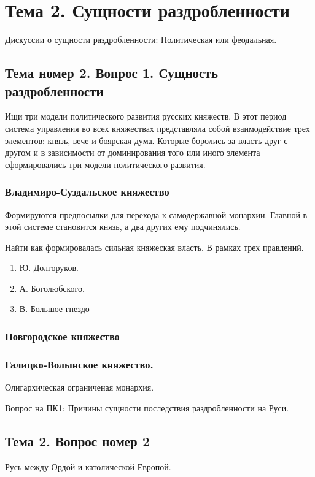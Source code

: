 \documentclass[a4paper]{article}
\begin{document}
\section{Тема 2. Сущности раздробленности}

Дискуссии о сущности раздробленности:
Политическая или феодальная.

 
\subsection{Тема номер 2. Вопрос 1. Сущность раздробленности}
Ищи три модели политического развития русских княжеств.
В этот период система управления во всех княжествах представляла собой взаимодействие трех элементов: князь, вече и боярская дума. Которые боролись за власть друг с другом и в зависимости от доминирования того или иного элемента сформировались три модели политического развития.

\subsubsection{Владимиро-Суздальское княжество}
Формируются предпосылки для перехода к самодержавной монархии. Главной в этой системе становится князь, а два других ему подчинялись.

Найти как формировалась сильная княжеская власть. В рамках трех правлений.
\begin{enumerate}
\item Ю. Долгоруков. 
\item А. Боголюбского.
\item В. Большое гнездо
\end{enumerate}

\subsubsection{Новгородское княжество}
 
\subsubsection{Галицко-Волынское княжество.}
Олигархическая ограниченая монархия. 

Вопрос на ПК1: Причины сущности последствия раздробленности на Руси.

\subsection{Тема 2. Вопрос номер 2}
Русь между Ордой и католической Европой.
\end{document}
